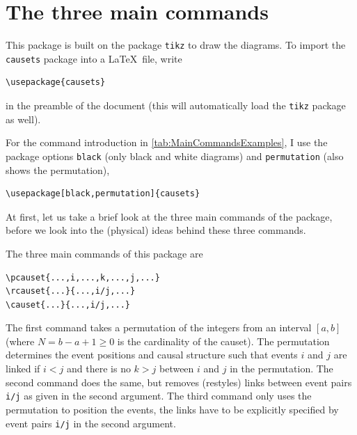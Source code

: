\documentclass[12pt]{article}
\begin{document}
\clearpage


\section{The three main commands}
\label{sec:Introduction}

This package is built on the package \lstinline&tikz& to draw the diagrams.
To import the \lstinline&causets& package into a \LaTeX\ file, write
\begin{lstlisting}
\usepackage{causets}
\end{lstlisting}
in the preamble of the document (this will automatically load the \lstinline&tikz& package as well).

For the command introduction in \autoref{tab:MainCommandsExamples}, I use the package options \lstinline&black& (only black and white diagrams) and \lstinline&permutation& (also shows the permutation),
\begin{lstlisting}
\usepackage[black,permutation]{causets}
\end{lstlisting}
At first, let us take a brief look at the three main commands of the package, before we look into the (physical) ideas behind these three commands.

The three main commands of this package are
\begin{lstlisting}
\pcauset{...,i,...,k,...,j,...}
\rcauset{...}{...,i/j,...}
\causet{...}{...,i/j,...}
\end{lstlisting}
The first command takes a permutation of the integers from an interval $[ a, b ]$ (where $N = b - a + 1 \geq 0$ is the cardinality of the causet).
The permutation determines the event positions and causal structure such that events $i$ and $j$ are linked if $i < j$ and there is no $k > j$ between $i$ and $j$ in the permutation.
The second command does the same, but removes (restyles) links between event pairs \lstinline&i/j& as given in the second argument.
The third command only uses the permutation to position the events, the links have to be explicitly specified by event pairs \lstinline&i/j& in the second argument.
\end{document}
